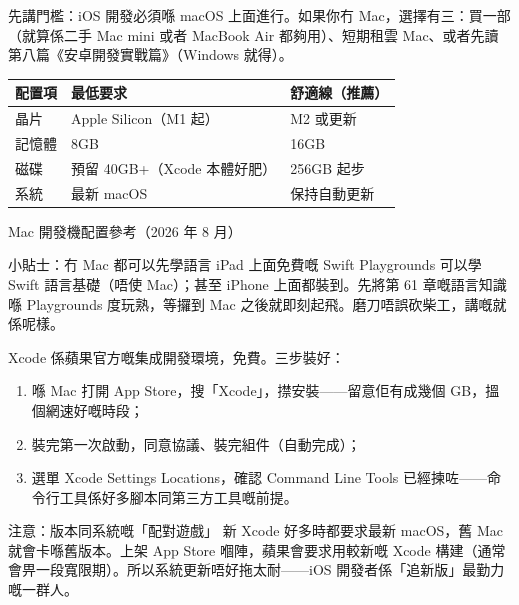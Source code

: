 


先講門檻：iOS 開發必須喺 macOS 上面進行。如果你冇 Mac，選擇有三：買一部（就算係二手 Mac mini 或者 MacBook Air 都夠用）、短期租雲 Mac、或者先讀第八篇《安卓開發實戰篇》（Windows 就得）。

\begin{center}
\begin{tabularx}{\linewidth}{|X|X|X|}
\hline
\textbf{配置項} & \textbf{最低要求} & \textbf{舒適線（推薦）} \tabularnewline
\hline
晶片 & Apple Silicon（M1 起） & M2 或更新 \tabularnewline
記憶體 & 8GB & 16GB \tabularnewline
磁碟 & 預留 40GB+（Xcode 本體好肥） & 256GB 起步 \tabularnewline
系統 & 最新 macOS & 保持自動更新 \tabularnewline
\hline
\end{tabularx}
\end{center}

\begin{center}\small\color{gray}Mac 開發機配置參考（2026 年 8 月）\end{center}

\begin{tcbinfo}{小貼士：冇 Mac 都可以先學語言}
iPad 上面免費嘅 Swift Playgrounds 可以學 Swift 語言基礎（唔使 Mac）；甚至 iPhone 上面都裝到。先將第 61 章嘅語言知識喺 Playgrounds 度玩熟，等攞到 Mac 之後就即刻起飛。磨刀唔誤砍柴工，講嘅就係呢樣。

\end{tcbinfo}


Xcode 係蘋果官方嘅集成開發環境，免費。三步裝好：

\begin{enumerate}
  \item 喺 Mac 打開 App Store，搜「Xcode」，㩒安裝——留意佢有成幾個 GB，搵個網速好嘅時段；
  \item 裝完第一次啟動，同意協議、裝完組件（自動完成）；
  \item 選單 Xcode Settings Locations，確認 Command Line Tools 已經揀咗——命令行工具係好多腳本同第三方工具嘅前提。
\end{enumerate}

\begin{tcbwarn}{注意：版本同系統嘅「配對遊戲」}
新 Xcode 好多時都要求最新 macOS，舊 Mac 就會卡喺舊版本。上架 App Store 嗰陣，蘋果會要求用較新嘅 Xcode 構建（通常會畀一段寬限期）。所以系統更新唔好拖太耐——iOS 開發者係「追新版」最勤力嘅一群人。

\end{tcbwarn}

